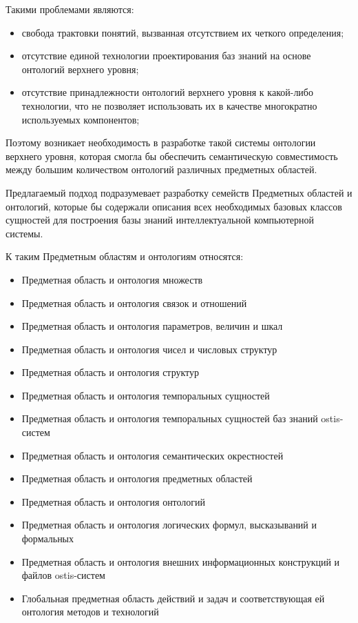 Такими проблемами являются:
\begin{itemize}
    \item свобода трактовки понятий, вызванная отсутствием их четкого определения;
    \item отсутствие единой технологии проектирования баз знаний на основе онтологий верхнего уровня;
    \item отсутствие принадлежности онтологий верхнего уровня к какой-либо технологии, что не позволяет использовать их в качестве многократно используемых компонентов;
\end{itemize}

Поэтому возникает необходимость в разработке такой системы онтологии верхнего уровня, которая смогла бы обеспечить семантическую совместимость между большим количеством онтологий различных предметных областей.

Предлагаемый подход подразумевает разработку семейств Предметных областей и онтологий, которые бы содержали описания всех необходимых базовых классов сущностей для построения базы знаний интеллектуальной компьютерной системы.

К таким Предметным областям и онтологиям относятся:

\begin{itemize}
\item Предметная область и онтология множеств
\item Предметная область и онтология связок и отношений
\item Предметная область и онтология параметров, величин и шкал
\item Предметная область и онтология чисел и числовых структур
\item Предметная область и онтология структур
\item Предметная область и онтология темпоральных сущностей
\item Предметная область и онтология темпоральных сущностей баз знаний ostis-систем
\item Предметная область и онтология семантических окрестностей
\item Предметная область и онтология предметных областей
\item Предметная область и онтология онтологий
\item Предметная область и онтология логических формул, высказываний и формальных %
\item Предметная область и онтология внешних информационных конструкций и файлов ostis-систем
\item Глобальная предметная область действий и задач и соответствующая ей онтология методов и технологий
\end{itemize}

